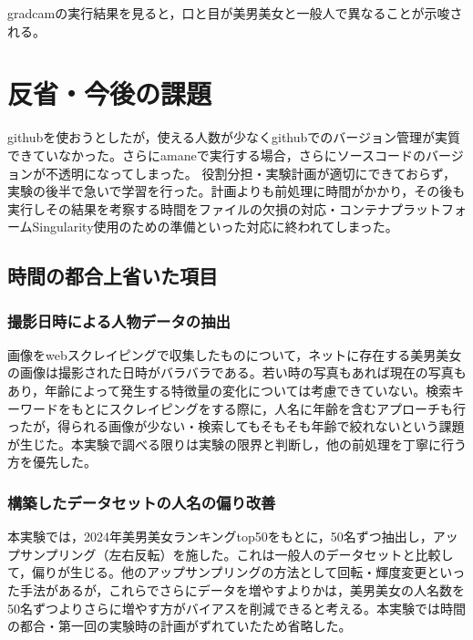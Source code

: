 \documentclass[a4paper,11pt,titlepage]{jsarticle}
\begin{document}
gradcamの実行結果を見ると，口と目が美男美女と一般人で異なることが示唆される。





\section{反省・今後の課題}



githubを使おうとしたが，使える人数が少なくgithubでのバージョン管理が実質できていなかった。さらにamaneで実行する場合，さらにソースコードのバージョンが不透明になってしまった。
役割分担・実験計画が適切にできておらず，実験の後半で急いで学習を行った。計画よりも前処理に時間がかかり，その後も実行しその結果を考察する時間をファイルの欠損の対応・コンテナプラットフォームSingularity使用のための準備といった対応に終われてしまった。

\subsection{時間の都合上省いた項目}
\subsubsection{撮影日時による人物データの抽出}
画像をwebスクレイピングで収集したものについて，ネットに存在する美男美女の画像は撮影された日時がバラバラである。若い時の写真もあれば現在の写真もあり，年齢によって発生する特徴量の変化については考慮できていない。検索キーワードをもとにスクレイピングをする際に，人名に年齢を含むアプローチも行ったが，得られる画像が少ない・検索してもそもそも年齢で絞れないという課題が生じた。本実験で調べる限りは実験の限界と判断し，他の前処理を丁寧に行う方を優先した。

\subsubsection{構築したデータセットの人名の偏り改善}
本実験では，2024年美男美女ランキングtop50をもとに，50名ずつ抽出し，アップサンプリング（左右反転）を施した。これは一般人のデータセットと比較して，偏りが生じる。他のアップサンプリングの方法として回転・輝度変更といった手法があるが，これらでさらにデータを増やすよりかは，美男美女の人名数を50名ずつよりさらに増やす方がバイアスを削減できると考える。本実験では時間の都合・第一回の実験時の計画がずれていたため省略した。
\end{document}
